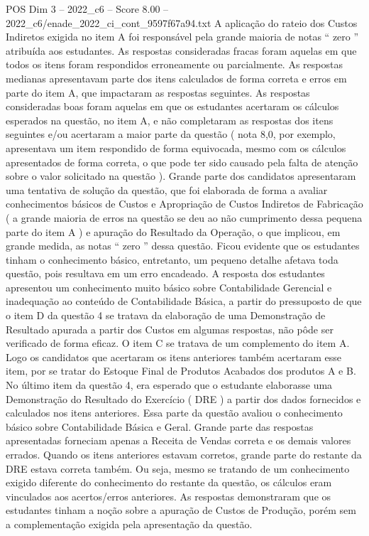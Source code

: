 \begin{textsample}{POS Dim 3 – 2022\_c6 – Score 8.00 – 2022\_c6/enade\_2022\_ci\_cont\_9597f67a94.txt}
A aplicação do rateio dos Custos Indiretos exigida no item A foi responsável pela grande maioria de notas “ zero ” atribuída aos estudantes.
As respostas consideradas fracas foram aquelas em que todos os itens foram respondidos erroneamente ou parcialmente.
As respostas medianas apresentavam parte dos itens calculados de forma correta e erros em parte do item A, que impactaram as respostas seguintes.
As respostas consideradas boas foram aquelas em que os estudantes acertaram os cálculos esperados na questão, no item A, e não completaram as respostas dos itens seguintes e/ou acertaram a maior parte da questão ( nota 8,0, por exemplo, apresentava um item respondido de forma equivocada, mesmo com os cálculos apresentados de forma correta, o que pode ter sido causado pela falta de atenção sobre o valor solicitado na questão ).
Grande parte dos candidatos apresentaram uma tentativa de solução da questão, que foi elaborada de forma a avaliar conhecimentos básicos de Custos e Apropriação de Custos Indiretos de Fabricação ( a grande maioria de erros na questão se deu ao não cumprimento dessa pequena parte do item A ) e apuração do Resultado da Operação, o que implicou, em grande medida, as notas “ zero ” dessa questão.
Ficou evidente que os estudantes tinham o conhecimento básico, entretanto, um pequeno detalhe afetava toda questão, pois resultava em um erro encadeado.
A resposta dos estudantes apresentou um conhecimento muito básico sobre Contabilidade Gerencial e inadequação ao conteúdo de Contabilidade Básica, a partir do pressuposto de que o item D da questão 4 se tratava da elaboração de uma Demonstração de Resultado apurada a partir dos Custos em algumas respostas, não pôde ser verificado de forma eficaz.
O item C se tratava de um complemento do item A.
Logo os candidatos que acertaram os itens anteriores também acertaram esse item, por se tratar do Estoque Final de Produtos Acabados dos produtos A e B.
No último item da questão 4, era esperado que o estudante elaborasse uma Demonstração do Resultado do Exercício ( DRE ) a partir dos dados fornecidos e calculados nos itens anteriores.
Essa parte da questão avaliou o conhecimento básico sobre Contabilidade Básica e Geral.
Grande parte das respostas apresentadas forneciam apenas a Receita de Vendas correta e os demais valores errados.
Quando os itens anteriores estavam corretos, grande parte do restante da DRE estava correta também.
Ou seja, mesmo se tratando de um conhecimento exigido diferente do conhecimento do restante da questão, os cálculos eram vinculados aos acertos/erros anteriores.
As respostas demonstraram que os estudantes tinham a noção sobre a apuração de Custos de Produção, porém sem a complementação exigida pela apresentação da questão.

\end{textsample}
